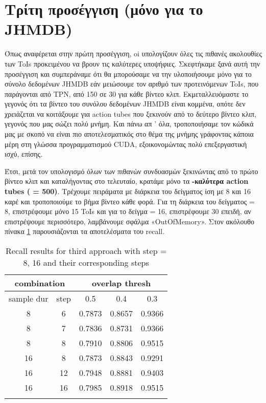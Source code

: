 \section{Tρίτη προσέγγιση (μόνο για το \en JHMDB)\gr}
Όπως αναφέρεται στην πρώτη προσέγγιση, oi \en\cite{DBLP:journals/corr/HouCS17} \gr υπολογίζουν όλες τις πιθανές ακολουθίες των \en ToIs \gr
προκειμένου να βρουν τις καλύτερες υποψήφιες. Σκεφτήκαμε ξανά αυτή την προσέγγιση και συμπεράναμε ότι θα μπορούσαμε  να την υλοποιήσουμε
μόνο για το σύνολο δεδομένων \en JHMDB \gr εάν μειώσουμε τον αριθμό των προτεινόμενων \en ToIs\gr, που παράγονται  από \en TPN\gr,
από 150 σε 30 για κάθε βίντεο κλιπ. Εκμεταλλευόμαστε το γεγονός ότι τα βίντεο του συνόλου δεδομένων \en JHMDB \gr είναι κομμένα, οπότε δεν
χρειάζεται να κοιτάξουμε για \en action tubes \gr που ξεκινούν από το δεύτερο βίντεο κλιπ, γεγονός  που μας σώζει πολύ μνήμη.
Και πάνω απ ' όλα, τροποποιήσαμε τον κώδικά μας με σκοπό να είναι πιο αποτελεσματικός στο θέμα της  μνήμης   γράφοντας κάποια μέρη στη γλώσσα προγραμματισμού \en CUDA\gr, εξοικονομώντας πολύ επεξεργαστική ισχύ, επίσης.  \par
Έτσι, μετά τον υπολογισμό  όλων των πιθανών συνδυασμών ξεκινώντας από το πρώτο βίντεο κλιπ και καταλήγοντας στο τελευταίο, κρατάμε μόνο τα
\textbf{-καλύτερα \en action tubes \gr ( = 500)}. Τρέχουμε πειράματα με  διάρκεια του δείγματος ίση με 8 και 16 καρέ και τροποποιούμε  το βήμα βίντεο κάθε φορά.
Για τη διάρκεια του δείγματος = 8, επιστρέφουμε μόνο 15 \en ToIs \gr και για το δείγμα  = 16, επιστρέφουμε 30 επειδή, αν επιστρέψουμε περισσότερο,
λαμβάνουμε σφάλμα \en «OutOfMemory»\gr. 
Στον ακόλουθο πίνακα \ref{table:gr_gr_conn_app3} παρουσιάζονται τα αποτελέσματα του \en recall\gr.
\begin{center}
\en
\begin{longtable}{||c c||c c c||}

  \hline
  \multicolumn{2}{||c||}{\textbf{combination}} &\multicolumn{3}{|c||}{\textbf{overlap thresh}}\\
  \hline
  sample dur & step &  0.5  &  0.4 &  0.3 \\
  \hline   \hline

  8 & 6 & 0.7873 & 0.8657 & 0.9366  \\
  \hline
  8 & 7 & 0.7836 & 0.8731 & 0.9366  \\
  \hline
  8 &  8 & 0.7910 & 0.8806 & 0.9515 \\
  \hline 

  16 & 8  & 0.7873 & 0.8843 & 0.9291 \\
  \hline
  16 & 12 & 0.7948 & 0.8881 & 0.9403 \\
  \hline
  16 & 16 & 0.7985 & 0.8918 & 0.9515 \\
  \hline 
  \caption{Recall results for third approach with step = 8, 16 and their
corresponding steps }
  \label{table:gr_gr_conn_app3}
\end{longtable} 
\end{center}

